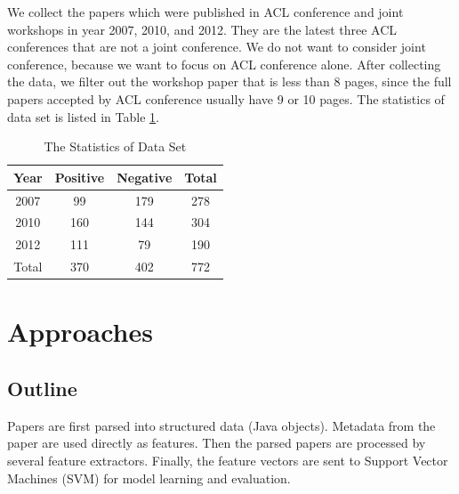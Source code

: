 \documentclass[11pt,letterpaper]{article}
\begin{document}
We collect the papers which were published in ACL conference and joint workshops in year 2007, 2010, and 2012. 
They are the latest three ACL conferences that are not a joint conference.
We do not want to consider joint conference, because we want to focus on ACL conference alone.
After collecting the data, we filter out the workshop paper that is less than 8 pages, since the full papers accepted by ACL conference usually have 9 or 10 pages.
The statistics of data set is listed in Table \ref{tab:statistics}.

\begin{table}
\begin{center}
\begin{tabular}{|c|c|c|c|}
\hline 
Year & Positive &	Negative & Total\\ \hline 
2007 & 99  &	179 & 278\\ \hline	
2010 	& 160 &  144 & 304	\\ \hline
2012 	& 111 & 79 & 190 \\ \hline
Total & 370 & 402 & 772 \\\hline	
\end{tabular}
\end{center}
\caption{The Statistics of Data Set}
\label{tab:statistics}
\end{table}

\section{Approaches}
\subsection{Outline}
Papers are first parsed into structured data (Java objects). Metadata from the paper are used directly as features. 
Then the parsed papers are processed by several feature extractors. Finally, the feature vectors are sent to Support 
Vector Machines (SVM) for model learning and evaluation.
\end{document}
